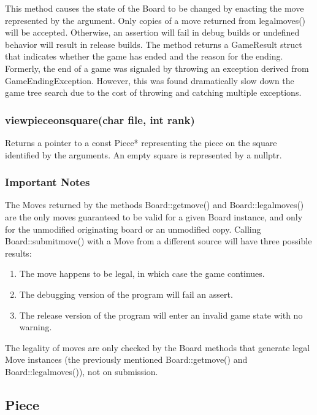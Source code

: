\documentclass[letterpaper]{article}
\newcommand{\code}[1]{\textsf{#1}}
\renewcommand{\_}{\allowbreak\textunderscore\allowbreak}
\begin{document}
This method causes the state of the \code{Board} to be changed by enacting the move represented by the argument. Only copies of a move returned from \code{legal\_moves()} will be accepted. Otherwise, an assertion will fail in debug builds or undefined behavior will result in release builds. The method returns a \code{Game\_Result} \code{struct} that indicates whether the game has ended and the reason for the ending. Formerly, the end of a game was signaled by throwing an exception derived from \code{Game\_Ending\_Exception}. However, this was found dramatically slow down the game tree search due to the cost of throwing and catching multiple exceptions.

\subsubsection[view\_piece\_on\_square()]{view\_piece\_on\_square(char file, int rank)}
Returns a pointer to a \code{const Piece*} representing the piece on the square identified by the arguments. An empty square is represented by a \code{nullptr}.

\subsubsection{Important Notes}
\label{board_important_notes}
The \code{Move}s returned by the methods \code{Board::get\_move()} and \code{Board::legal\_moves()} are the only moves guaranteed to be valid for a given \code{Board} instance, and only for the unmodified originating board or an unmodified copy. Calling \code{Board::submit\_move()} with a \code{Move} from a different source will have three possible results:
\begin{enumerate}
	\item The move happens to be legal, in which case the game continues.
	\item The debugging version of the program will fail an \code{assert}.
	\item The release version of the program will enter an invalid game state with no warning.
\end{enumerate}
The legality of moves are only checked by the \code{Board} methods that generate legal \code{Move} instances (the previously mentioned \code{Board::get\_move()} and \code{Board::legal\_moves()}), not on submission.

\subsection{Piece}
\end{document}
